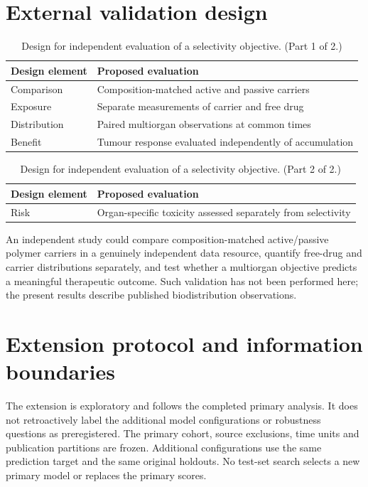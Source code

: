 \documentclass[11pt]{article}
\begin{document}
\section{External validation design}
\begin{table}[H]
\centering
\small
\begin{tabularx}{\linewidth}{@{}>{\raggedright\arraybackslash}X>{\raggedright\arraybackslash}X@{}}
\toprule
\textbf{Design element} & \textbf{Proposed evaluation} \\
\midrule
Comparison & Composition-matched active and passive carriers \\
Exposure & Separate measurements of carrier and free drug \\
Distribution & Paired multiorgan observations at common times \\
Benefit & Tumour response evaluated independently of accumulation \\
\bottomrule
\end{tabularx}
\caption{Design for independent evaluation of a selectivity objective. (Part 1 of 2.)}
\label{tab:result-24}
\end{table}
\begin{table}[H]
\centering
\small
\ContinuedFloat
\begin{tabularx}{\linewidth}{@{}>{\raggedright\arraybackslash}X>{\raggedright\arraybackslash}X@{}}
\toprule
\textbf{Design element} & \textbf{Proposed evaluation} \\
\midrule
Risk & Organ-specific toxicity assessed separately from selectivity \\
\bottomrule
\end{tabularx}
\caption{Design for independent evaluation of a selectivity objective. (Part 2 of 2.)}
\end{table}
An independent study could compare composition-matched active/passive polymer carriers in a genuinely independent data resource, quantify free-drug and carrier distributions separately, and test whether a multiorgan objective predicts a meaningful therapeutic outcome. Such validation has not been performed here; the present results describe published biodistribution observations.

\section{Extension protocol and information boundaries}
The extension is exploratory and follows the completed primary analysis. It does not retroactively label the additional model configurations or robustness questions as preregistered. The primary cohort, source exclusions, time units and publication partitions are frozen. Additional configurations use the same prediction target and the same original holdouts. No test-set search selects a new primary model or replaces the primary scores.
\end{document}
